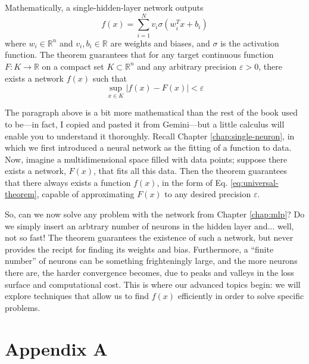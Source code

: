 \documentclass[11pt,a4paper,oneside]{book}
\theoremstyle{definition}
\theoremstyle{plain}
\theoremstyle{remark}
\begin{document}
Mathematically, a single-hidden-layer network outputs
\begin{equation}
    \label{eq:universal-theorem}
    f(x) = \sum_{i=1}^N v_i \sigma(w_i^T x + b_i)
\end{equation}
where $w_i \in \mathbb{R}^n$ and $v_i, b_i \in \mathbb{R}$ are weights and biases, and $\sigma$ is the activation function. The theorem guarantees that for any target continuous function $F: K \to \mathbb{R}$ on a compact set $K \subset \mathbb{R}^n$ and any arbitrary precision $\varepsilon > 0$, there exists a network $f(x)$ such that
\begin{equation}
    \label{eq:sup-universal-theorem}
    \sup_{x \in K} \vert{}f(x) - F(x)\vert{} < \varepsilon
\end{equation}

The paragraph above is a bit more mathematical than the rest of the book used to be—in fact, I copied and pasted it from Gemini—but a little calculus will enable you to understand it thoroughly. Recall Chapter \ref{chap:single-neuron}, in which we first introduced a neural network as the fitting of a function to data. Now, imagine a multidimensional space filled with data points; suppose there exists a network, $F(x)$, that fits all this data. Then the theorem guarantees that there always exists a function $f(x)$, in the form of Eq. \eqref{eq:universal-theorem}, capable of approximating $F(x)$ to any desired precision $\varepsilon$.

So, can we now solve any problem with the network from Chapter \ref{chap:mlp}? Do we simply insert an arbtrary number of neurons in the hidden layer and... well, not so fast! The theorem guarantees the existence of such a network, but never provides the recipt for finding its weights and bias. Furthermore, a ``finite number'' of neurons can be something frighteningly large, and the more neurons there are, the harder convergence becomes, due to peaks and valleys in the loss surface and computational cost. This is where our advanced topics begin: we will explore techniques that allow us to find $f(x)$ efficiently in order to solve specific problems.



\chapter{Appendix A}
\end{document}

